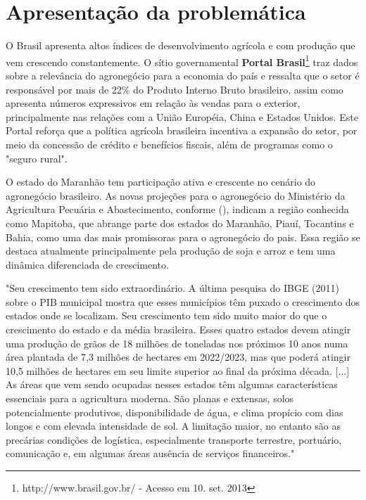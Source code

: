 \section{Apresentação da problemática}

O Brasil apresenta altos índices de desenvolvimento agrícola e com produção que vem crescendo constantemente. O sítio governamental \textbf{Portal Brasil}\footnote{http://www.brasil.gov.br/ - Acesso em 10. set. 2013} traz dados sobre a relevância do agronegócio para a economia do país e ressalta que o setor é responsável por mais de 22\% do Produto Interno Bruto brasileiro, assim como apresenta números expressivos em relação às vendas para o exterior, principalmente nas relações com a União Européia, China e Estados Unidos. Este Portal reforça que a política agrícola brasileira incentiva a expansão do setor, por meio da concessão de crédito e benefícios fiscais, além de programas como o "seguro rural".

O estado do Maranhão tem participação ativa e crescente no cenário do agronegócio brasileiro. As novas projeções para o agronegócio do Ministério da Agricultura Pecuária e Abastecimento, conforme \citeauthor{brministerioAgricultura2013} (\citeyear{brministerioAgricultura2013}), indicam a região conhecida como Mapitoba, que abrange parte dos estados do Maranhão, Piauí, Tocantins e Bahia, como uma das mais promissoras para o agronegócio do pais. Essa região se destaca atualmente principalmente pela produção de soja e arroz e tem uma dinâmica diferenciada de crescimento.

\begin{citacao}
"Seu crescimento tem sido extraordinário. A última pesquisa do IBGE (2011) sobre o PIB municipal mostra que esses 
municípios têm puxado o crescimento dos estados onde se localizam. Seu crescimento tem sido muito maior do que o crescimento do estado e da média brasileira. Esses quatro estados devem atingir uma produção de grãos de 18 milhões de toneladas nos próximos 10 anos numa área plantada de 7,3 milhões de hectares em 2022/2023, mas que poderá atingir 10,5 milhões de hectares em seu limite superior ao final da próxima década. [...] As áreas que vem sendo ocupadas nesses estados têm algumas características essenciais para a agricultura moderna. São planas e extensas, solos potencialmente produtivos, disponibilidade de água, e clima propício com dias longos e com elevada intensidade de sol. A limitação maior, no entanto são as precárias condições de logística, especialmente transporte terrestre, portuário, comunicação e, em algumas áreas ausência de serviços financeiros."
\cite[p. 64]{brministerioAgricultura2013}
\end{citacao}

